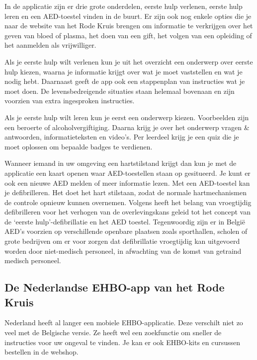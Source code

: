 In de applicatie zijn er drie grote onderdelen, eerste hulp verlenen, eerste hulp leren en een \gls{AED}-toestel vinden in de buurt. Er zijn ook nog enkele opties die je naar de website van het Rode Kruis brengen om informatie te verkrijgen over het geven van bloed of plasma, het doen van een gift, het volgen van een opleiding of het aanmelden als vrijwilliger.

Als je eerste hulp wilt verlenen kun je uit het overzicht een onderwerp over eerste hulp kiezen, waarna je informatie krijgt over wat je moet vaststellen en wat je nodig hebt. Daarnaast geeft de app ook een stappenplan van instructies wat je moet doen. De levensbedreigende situaties staan helemaal bovenaan en zijn voorzien van extra ingesproken instructies.

Als je eerste hulp wilt leren kun je eerst een onderwerp kiezen. Voorbeelden zijn een beroerte of alcoholvergiftiging. Daarna krijg je over het onderwerp vragen \& antwoorden, informatieteksten en video's. Per leerdeel krijg je een quiz die je moet oplossen om bepaalde badges te verdienen.

Wanneer iemand in uw omgeving een hartstilstand krijgt dan kun je met de applicatie een kaart openen waar \gls{AED}-toestellen staan op gesitueerd. Je kunt er ook een nieuwe \gls{AED} melden of meer informatie lezen. Met een \gls{AED}-toestel kan je defibrilleren. Het doet het hart stilstaan, zodat de normale hartmechanismen de controle opnieuw kunnen overnemen. \autocite{gezondheid.be2018} Volgens \autocite{Koster1999} heeft het belang van vroegtijdig defibrilleren voor het verhogen van de overlevingskans geleid tot het concept van de ‘eerste hulp’-defibrillatie en het \gls{AED} toestel. Tegenwoordig zijn er in België \gls{AED}’s voorzien op verschillende openbare plaatsen zoals sporthallen, scholen of grote bedrijven om er voor zorgen dat defibrillatie vroegtijdig kan uitgevoerd worden door niet-medisch personeel, in afwachting van de komst van getraind medisch personeel.

\subsection{De Nederlandse EHBO-app van het Rode Kruis}
Nederland heeft al langer een mobiele EHBO-applicatie. Deze verschilt niet zo veel met de Belgische versie. Ze heeft wel een zoekfunctie om sneller de instructies voor uw ongeval te vinden. Je kan er ook EHBO-kits en cursussen bestellen in de webshop.